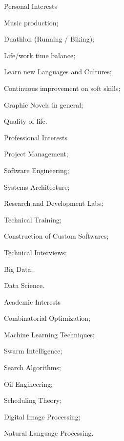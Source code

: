 \noindent
\vspace{-0.3cm}
\begin{multicols*}{3}
\begin{cventries}
\noindent
\cventry
   {Personal Interests}{}{}{}
   {
     \begin{cvitems}
       \item Music production;
       \item Duathlon (Running / Biking);
       \item Life/work time balance;
       \item Learn new Languages and Cultures;
       \item Continuous improvement on soft skills;
       \item Graphic Novels in general;
       \item Quality of life.
       \end{cvitems}
   }
\end{cventries}
\columnbreak
\begin{cventries}
\noindent
\cventry
    {Professional Interests}{}{}{}
    {
      \begin{cvitems}
        \item Project Management;
        \item Software Engineering;
        \item Systems Architecture;
        \item Research and Development Labs;
        \item Technical Training;
        \item Construction of Custom Softwares;
        \item Technical Interviews;
        \item Big Data;
        \item Data Science.
      \end{cvitems}
    }
\end{cventries}
\columnbreak
\begin{cventries}
\noindent
\cventry
    {Academic Interests}{}{}{}
    {
      \begin{cvitems}
        \item Combinatorial Optimization;
        \item Machine Learning Techniques;
        \item Swarm Intelligence;
        \item Search Algorithms;
        \item Oil Engineering;
        \item Scheduling Theory;
        \item Digital Image Processing;
        \item Natural Language Processing.
      \end{cvitems}
    }
\end{cventries}
\end{multicols*}
